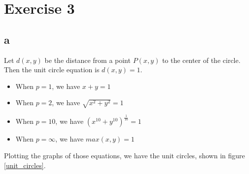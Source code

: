 \section*{Exercise 3}
\subsection*{a}

Let $d(x,y)$ be the distance from a point $P(x,y)$ to the center of the circle. Then the unit circle equation is $d(x,y) = 1$.

\begin{itemize}
    \item When $p = 1$, we have $x + y = 1$
    \item When $p = 2$, we have $\sqrt{x^2 + y^2} = 1$
    \item When $p = 10$, we have $(x^{10} + y^{10})^{\frac{1}{10}} = 1$
    \item When $p = \infty$, we have $max(x,y) = 1$
\end{itemize}

Plotting the graphs of those equations, we have the unit circles, shown in figure \ref{unit_circles}.

